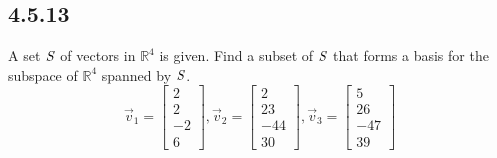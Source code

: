 \documentclass{article}
\begin{document}
\subsection{4.5.13}

A set $ \mathit{S} $ of vectors in $ \mathbb{R}^4 $ is given. Find a subset of $ \mathit{S} $ that forms a basis for the subspace of $ \mathbb{R}^4 $ spanned by $ \mathit{S} $.
\begin{equation*}
	\vec{v}_1 = \begin{bmatrix} 2 \\ 2 \\ -2 \\ 6 \end{bmatrix},
	\vec{v}_2 = \begin{bmatrix} 2 \\ 23 \\ -44 \\ 30 \end{bmatrix},
	\vec{v}_3 = \begin{bmatrix} 5 \\ 26 \\ -47 \\ 39 \end{bmatrix}
\end{equation*}
\end{document}
